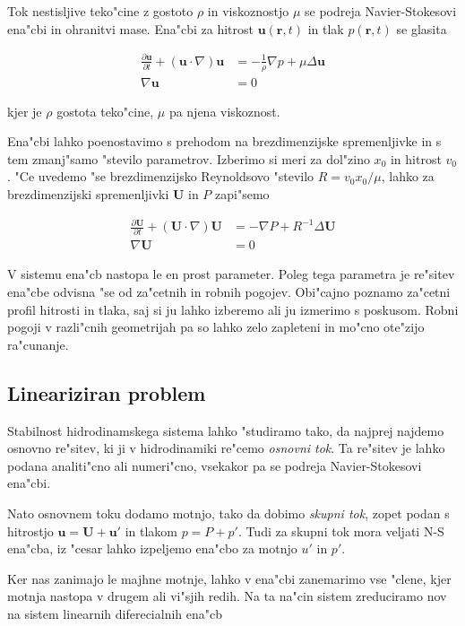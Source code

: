 \documentclass[a4paper,12pt]{article}
\renewcommand{\vec}{\mathbf}
\newcommand{\rt}{(\vec r, t)}
\begin{document}
Tok nestisljive teko"cine z gostoto $\rho$ in viskoznostjo $\mu$ se podreja Navier-Stokesovi ena"cbi in ohranitvi mase. Ena"cbi za hitrost $\vec u\rt$ in tlak $p\rt$ se glasita

\begin{align}
 \label{eq:ns-enacba}
\frac{\partial \vec u}{\partial t} + (\vec u \cdot \nabla) \vec u &= -\frac{1}{\rho}\nabla p + \mu \Delta \vec u \\
\nabla \vec u &= 0
\end{align}

kjer je $\rho$ gostota teko"cine, $\mu$ pa njena viskoznost. 

Ena"cbi lahko poenostavimo s prehodom na brezdimenzijske spremenljivke in s tem zmanj"samo "stevilo parametrov. Izberimo si meri za dol"zino $x_0$ in hitrost $v_0$. "Ce uvedemo "se brezdimenzijsko Reynoldsovo "stevilo $R=v_0 x_0 / \mu$, lahko za brezdimenzijski spremenljivki $\vec U$ in $P$ zapi"semo

\begin{align}
 \label{eq:ns-brezdim}
\frac{\partial \vec U}{\partial t} + (\vec U \cdot \nabla) \vec U &= -\nabla P + R^{-1} \Delta \vec U \\
\nabla \vec U &= 0
\end{align}

V sistemu ena"cb nastopa le en prost parameter. Poleg tega parametra je re"sitev ena"cbe odvisna "se od za"cetnih in robnih pogojev. Obi"cajno poznamo za"cetni profil hitrosti in tlaka, saj si ju lahko izberemo ali ju izmerimo s poskusom. Robni pogoji v razli"cnih geometrijah pa so lahko zelo zapleteni in mo"cno ote"zijo ra"cunanje. 

\subsection{Lineariziran problem}

Stabilnost hidrodinamskega sistema lahko "studiramo tako, da najprej najdemo osnovno re"sitev, ki ji v hidrodinamiki re"cemo \emph{osnovni tok}. Ta re"sitev je lahko podana analiti"cno ali numeri"cno, vsekakor pa se podreja Navier-Stokesovi ena"cbi. 

Nato osnovnem toku dodamo motnjo, tako da dobimo \emph{skupni tok}, zopet podan s hitrostjo $\vec u = \vec U + \vec u'$ in tlakom $p = P + p'$. Tudi za skupni tok mora veljati N-S ena"cba, iz "cesar lahko izpeljemo ena"cbo za motnjo $u'$ in $p'$. 

Ker nas zanimajo le majhne motnje, lahko v ena"cbi zanemarimo vse "clene, kjer motnja nastopa v drugem ali vi"sjih redih. Na ta na"cin sistem zreduciramo nov na sistem linearnih diferecialnih ena"cb 
\end{document}

